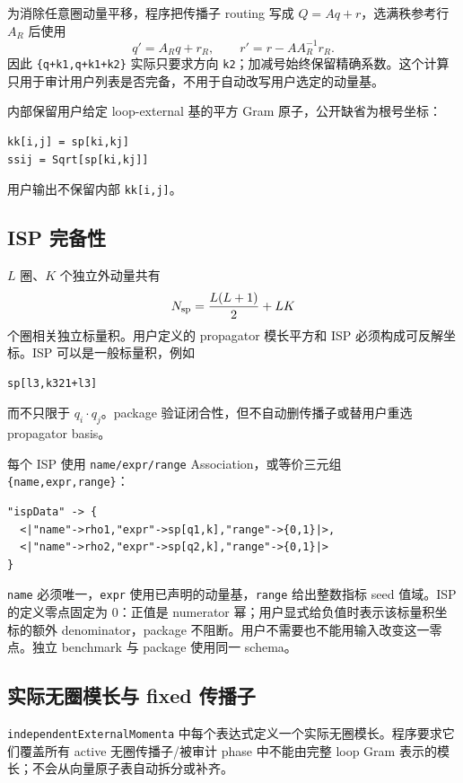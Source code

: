 ﻿\documentclass[a4paper,11pt]{article}
\begin{document}
为消除任意圈动量平移，程序把传播子 routing 写成 $Q=Aq+r$，选满秩参考行 $A_R$ 后使用
\begin{equation}
 q'=A_Rq+r_R,\qquad r'=r-AA_R^{-1}r_R.
\end{equation}
因此 \texttt{\{q+k1,q+k1+k2\}} 实际只要求方向 \texttt{k2}；加减号始终保留精确系数。这个计算只用于审计用户列表是否完备，不用于自动改写用户选定的动量基。

内部保留用户给定 loop-external 基的平方 Gram 原子，公开缺省为根号坐标：
\begin{verbatim}
kk[i,j] = sp[ki,kj]
ssij = Sqrt[sp[ki,kj]]
\end{verbatim}
用户输出不保留内部 \texttt{kk[i,j]}。

\subsection{ISP 完备性}

$L$ 圈、$K$ 个独立外动量共有
\begin{equation}
 N_{\rm sp}=\frac{L(L+1)}2+LK
\end{equation}
个圈相关独立标量积。用户定义的 propagator 模长平方和 ISP 必须构成可反解坐标。ISP 可以是一般标量积，例如
\begin{verbatim}
sp[l3,k321+l3]
\end{verbatim}
而不只限于 $q_i\cdot q_j$。package 验证闭合性，但不自动删传播子或替用户重选 propagator basis。

每个 ISP 使用 \texttt{name/expr/range} Association，或等价三元组 \texttt{\{name,expr,range\}}：
\begin{verbatim}
"ispData" -> {
  <|"name"->rho1,"expr"->sp[q1,k],"range"->{0,1}|>,
  <|"name"->rho2,"expr"->sp[q2,k],"range"->{0,1}|>
}
\end{verbatim}
\texttt{name} 必须唯一，\texttt{expr} 使用已声明的动量基，\texttt{range} 给出整数指标 seed 值域。ISP 的定义零点固定为 $0$：正值是 numerator 幂；用户显式给负值时表示该标量积坐标的额外 denominator，package 不阻断。用户不需要也不能用输入改变这一零点。独立 benchmark 与 package 使用同一 schema。

\subsection{实际无圈模长与 fixed 传播子}

\texttt{independentExternal\allowbreak Momenta} 中每个表达式定义一个实际无圈模长。程序要求它们覆盖所有 active 无圈传播子/被审计 phase 中不能由完整 loop Gram 表示的模长；不会从向量原子表自动拆分或补齐。
\end{document}
